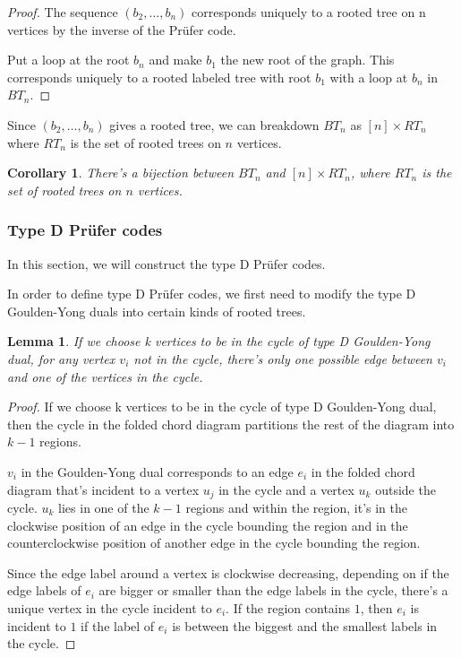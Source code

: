 \documentclass[11pt]{amsart}
\newtheorem{lemma}[thm]{Lemma}%
\newtheorem{cor}[thm]{Corollary}%
\begin{document}
\begin{proof}
    The sequence $(b_2,\dots,b_n)$ corresponds uniquely to a rooted tree on n vertices by the inverse of the Pr\"{u}fer code.

    Put a loop at the root $b_n$ and make $b_1$ the new root of the graph. This corresponds uniquely to a rooted labeled tree with root $b_1$ with a loop at $b_n$ in $BT_n$.
\end{proof}

Since $(b_2,\dots,b_n)$ gives a rooted tree, we can breakdown $BT_n$ as $[n] \times RT_n$ where $RT_n$ is the set of rooted trees on $n$ vertices.

\begin{cor}
    There's a bijection between $BT_n$ and $[n] \times RT_n$, where $RT_n$ is the set of rooted trees on $n$ vertices.
\end{cor}

\subsubsection{Type D Pr\"{u}fer codes}
In this section, we will construct the type D Pr\"{u}fer codes.

In order to define type D Pr\"{u}fer codes, we first need to modify the type D Goulden-Yong duals into certain kinds of rooted trees.

\begin{lemma}
    If we choose k vertices to be in the cycle of type D Goulden-Yong dual, for any vertex $v_i$ not in the cycle, there's only one possible edge between $v_i$ and one of the vertices in the cycle.
\end{lemma}

\begin{proof}
    If we choose k vertices to be in the cycle of type D Goulden-Yong dual, then the cycle in the folded chord diagram partitions the rest of the diagram into $k-1$ regions.

    $v_i$ in the Goulden-Yong dual corresponds to an edge $e_i$ in the folded chord diagram that's incident to a vertex $u_j$ in the cycle and a vertex $u_k$ outside the cycle. $u_k$ lies in one of the $k-1$ regions and within the region, it's in the clockwise position of an edge in the cycle bounding the region and in the counterclockwise position of another edge in the cycle bounding the region. 
    
    Since the edge label around a vertex is clockwise decreasing, depending on if the edge labels of $e_i$ are bigger or smaller than the edge labels in the cycle, there's a unique vertex in the cycle incident to $e_i$. If the region contains $1$, then $e_i$ is incident to $1$ if the label of $e_i$ is between the biggest and the smallest labels in the cycle.
\end{proof}
\end{document}
